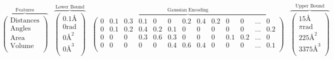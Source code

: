 \begin{equation}
    \begin{array}{cccc}
     \overbrace{\left(
    \begin{array}{c}
     \text{Distances} \\
     \text{Angles} \\
     \text{Area} \\
     \text{Volume} \\
    \end{array}
    \right)}^{\text{Features}} & \overbrace{\left(
    \begin{array}{c}
     0.1\text{\AA} \\
     0\text{rad} \\
     0\text{\AA}^2 \\
     0\text{\AA}^3 \\
    \end{array}
    \right)}^{\text{Lower Bound}} & \overbrace{\left(
    \begin{array}{ccccccccccccc}
     0 & 0.1 & 0.3 & 0.1 & 0 & 0 & 0.2 & 0.4 & 0.2 & 0 & 0 & \ldots  & 0 \\
     0 & 0.1 & 0.2 & 0.4 & 0.2 & 0.1 & 0 & 0 & 0 & 0 & 0 & \ldots  & 0.2 \\
     0 & 0 & 0 & 0.3 & 0.6 & 0.3 & 0 & 0 & 0 & 0.1 & 0.2 & \ldots  & 0 \\
     0 & 0 & 0 & 0 & 0 & 0.4 & 0.6 & 0.4 & 0 & 0 & 0 & \ldots  & 0.1 \\
    \end{array}
    \right)}^{\text{Gaussian Encoding}} & \overbrace{\left(
    \begin{array}{c}
     15\text{\AA} \\
     \pi \text{rad} \\
     225\text{\AA}^2 \\
     3375\text{\AA}^3 \\
    \end{array}
    \right)}^{\text{Upper Bound}} \\
    \end{array}
\end{equation}